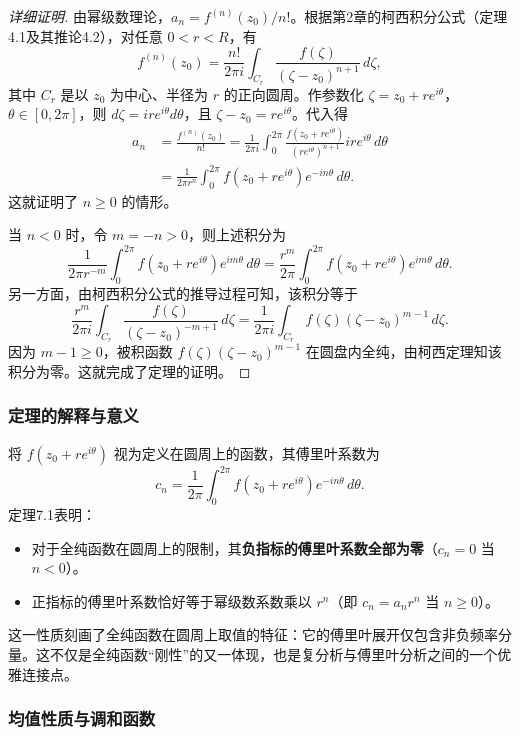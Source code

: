 \documentclass[UTF8]{ctexart}
\numberwithin{equation}{section}
\begin{document}
\begin{proof}[详细证明]
由幂级数理论，$a_n = f^{(n)}(z_0)/n!$。根据第2章的柯西积分公式（定理4.1及其推论4.2），对任意 $0<r<R$，有
\[
f^{(n)}(z_0) = \frac{n!}{2\pi i} \int_{C_r} \frac{f(\zeta)}{(\zeta-z_0)^{n+1}}\,d\zeta ,
\]
其中 $C_r$ 是以 $z_0$ 为中心、半径为 $r$ 的正向圆周。作参数化 $\zeta = z_0 + re^{i\theta}$，$\theta\in[0,2\pi]$，则 $d\zeta = ire^{i\theta}d\theta$，且 $\zeta - z_0 = re^{i\theta}$。代入得
\[
\begin{aligned}
a_n &= \frac{f^{(n)}(z_0)}{n!} 
= \frac{1}{2\pi i} \int_0^{2\pi} \frac{f(z_0 + re^{i\theta})}{(re^{i\theta})^{n+1}} ire^{i\theta}\,d\theta \\
&= \frac{1}{2\pi r^n} \int_0^{2\pi} f(z_0 + re^{i\theta}) e^{-in\theta}\,d\theta .
\end{aligned}
\]
这就证明了 $n\ge0$ 的情形。

当 $n<0$ 时，令 $m = -n >0$，则上述积分为
\[
\frac{1}{2\pi r^{-m}} \int_0^{2\pi} f(z_0 + re^{i\theta}) e^{im\theta}\,d\theta 
= \frac{r^m}{2\pi} \int_0^{2\pi} f(z_0 + re^{i\theta}) e^{im\theta}\,d\theta .
\]
另一方面，由柯西积分公式的推导过程可知，该积分等于
\[
\frac{r^m}{2\pi i} \int_{C_r} \frac{f(\zeta)}{(\zeta-z_0)^{-m+1}}\,d\zeta = \frac{1}{2\pi i} \int_{C_r} f(\zeta)(\zeta-z_0)^{m-1}\,d\zeta .
\]
因为 $m-1 \ge 0$，被积函数 $f(\zeta)(\zeta-z_0)^{m-1}$ 在圆盘内全纯，由柯西定理知该积分为零。这就完成了定理的证明。
\end{proof}

\subsubsection{定理的解释与意义}

将 $f(z_0 + re^{i\theta})$ 视为定义在圆周上的函数，其傅里叶系数为
\[
c_n = \frac{1}{2\pi} \int_0^{2\pi} f(z_0 + re^{i\theta}) e^{-in\theta}\,d\theta .
\]
定理7.1表明：
\begin{itemize}
    \item 对于全纯函数在圆周上的限制，其\textbf{负指标的傅里叶系数全部为零}（$c_n = 0$ 当 $n<0$）。
    \item 正指标的傅里叶系数恰好等于幂级数系数乘以 $r^n$（即 $c_n = a_n r^n$ 当 $n\ge0$）。
\end{itemize}
这一性质刻画了全纯函数在圆周上取值的特征：它的傅里叶展开仅包含非负频率分量。这不仅是全纯函数“刚性”的又一体现，也是复分析与傅里叶分析之间的一个优雅连接点。

\subsubsection{均值性质与调和函数}
\end{document}
